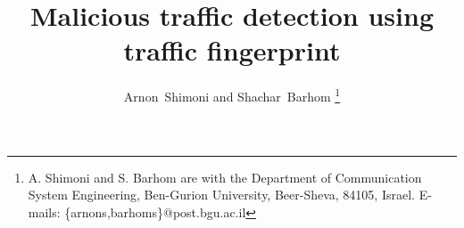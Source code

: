 \documentclass[9pt,journal,compsoc]{IEEEtran}
\begin{document}
%
\title{Malicious traffic detection using traffic fingerprint}
%
%
%
%

\author{Arnon~Shimoni and
        Shachar~Barhom%
\thanks{A. Shimoni and S. Barhom are with the Department of Communication System Engineering, Ben-Gurion University, Beer-Sheva, 84105, Israel. E-mails: \{arnons,barhoms\}@post.bgu.ac.il}}
\end{document}
